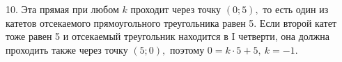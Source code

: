 10. Эта прямая при любом $k$ проходит через точку $(0;5),$ то есть один из катетов отсекаемого прямоугольного треугольника равен 5. Если второй катет тоже равен 5 и отсекаемый треугольник находится в I четверти, она должна проходить также через точку $(5;0),$ поэтому $0=k\cdot5+5,\ k=-1.$\\

